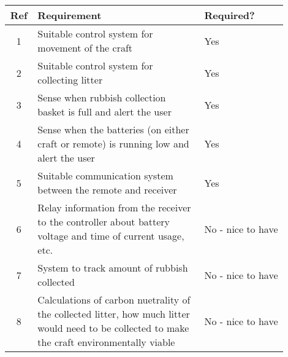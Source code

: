 \documentclass [11pt]{article}
\begin{document}
\begin{appendix}
\begin{table}[H]
\begin{tabular}{||c||p{0.6\linewidth}|p{0.3\linewidth}||}
\hline
Ref & Requirement                                                                                                                                  & Required?         \\ 
\hline
1   & Suitable control system for movement of the craft                                                                                              & Yes               \\
\hline
2   & Suitable control system for collecting litter                                                                                                  & Yes               \\
\hline
3   & Sense when rubbish collection basket is full and alert the user                                                                                & Yes               \\
\hline
4   & Sense when the batteries (on either craft or remote) is running low and alert the user                                                         & Yes               \\
\hline
5   & Suitable communication system between the remote and receiver                                                                                  & Yes               \\
\hline
6   & Relay information from the receiver to the controller about battery voltage and time of current usage, etc.                                    & No - nice to have \\
\hline
7   & System to track amount of rubbish collected                                                                                                    & No - nice to have \\
\hline
8   & Calculations of carbon nuetrality of the collected litter, how much litter would need to be collected to make the craft environmentally viable & No - nice to have \\
\hline
\end{tabular}
\end{table}




\end{appendix}
\end{document}
